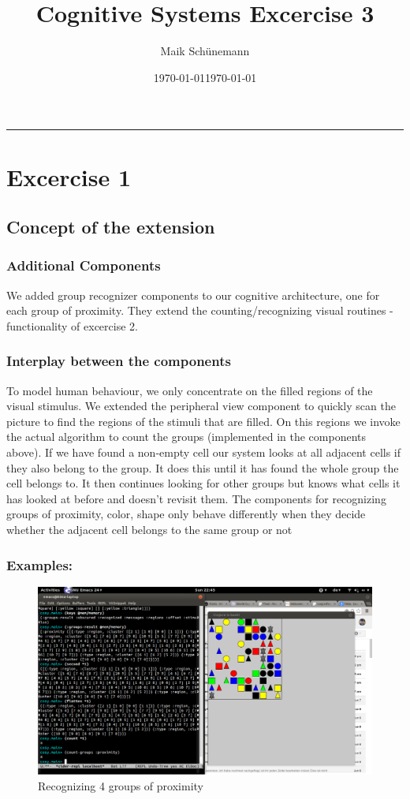 \documentclass[final,paper=a4,paper=portraitmpagesize=auto,fontsize=11pt,ngerman]{scrartcl}
\date{\today}
\author{Maik Schünemann}
\date{\today}
\title{Cognitive Systems Excercise 3}
\begin{document}
\maketitle
\tableofcontents


\rule{\linewidth}{0.5pt}
\section{Excercise 1}
\label{sec-1}

\subsection{Concept of the extension}
\label{sec-1-1}
\subsubsection{Additional Components}
\label{sec-1-1-1}
We added group recognizer components to our cognitive
architecture, one for each group of proximity.
They extend the counting/recognizing visual routines - 
functionality of excercise 2. 
\subsubsection{Interplay between the components}
\label{sec-1-1-2}
To model human behaviour, we only concentrate on the filled
regions of the visual stimulus. We extended the peripheral view
component to quickly scan the picture to find the regions of 
the stimuli that are filled. 
On this regions we invoke the actual algorithm to count the 
groups (implemented in the components above).
If we have found a non-empty cell our system looks at all adjacent
cells if they also belong to the group. It does this until it has
found the whole group the cell belongs to.
It then continues looking for other groups but knows what cells it
has looked at before and doesn't revisit them.
The components for recognizing groups of proximity, color, shape 
only behave differently when they decide whether the adjacent cell
belongs to the same group or not

\subsubsection{Examples: \\}
\label{sec-1-1-3}

\begin{figure}[hbtp]
    \centering
    \includegraphics[width= 0.7 \textwidth]{grouping_example}
    \caption{Recognizing 4 groups of proximity}
    \label{fig:aufbau}
\end{figure}
\end{document}
